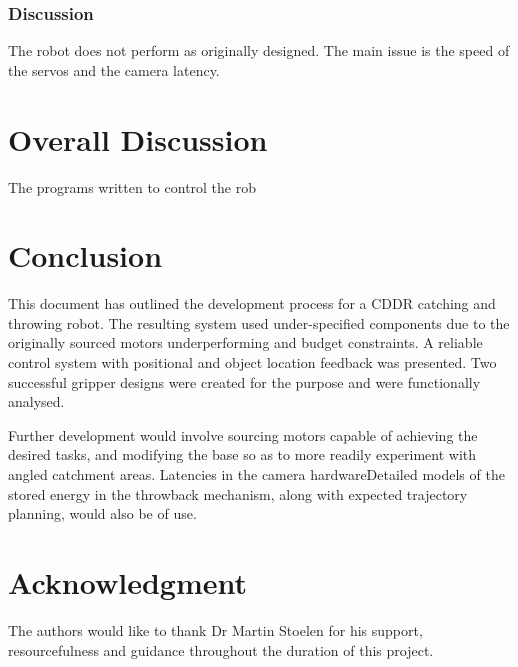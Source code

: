 \documentclass[conference]{IEEEtran}
\begin{document}
	\subsubsection{Discussion}
	The robot does not perform as originally designed. The main issue is the speed of the servos and the camera latency.
	

	\section{Overall Discussion}\label{overall}
	The programs written to control the rob
		
	\section{Conclusion}
	This document has outlined the development process for a CDDR catching and throwing robot. The resulting system used under-specified components due to the originally sourced motors underperforming and budget constraints. A reliable control system with positional and object location feedback was presented. Two successful gripper designs were created for the purpose and were functionally analysed.
	
	Further development would involve sourcing motors capable of achieving the desired tasks, and modifying the base so as to more readily experiment with angled catchment areas. Latencies in the camera hardwareDetailed models of the stored energy in the throwback mechanism, along with expected trajectory planning, would also be of use.

	
	
	\section*{Acknowledgment}
	
	
	The authors would like to thank Dr Martin Stoelen for his support, resourcefulness and guidance throughout the duration of this project.
	
	
	
	
	
	
\end{document}
